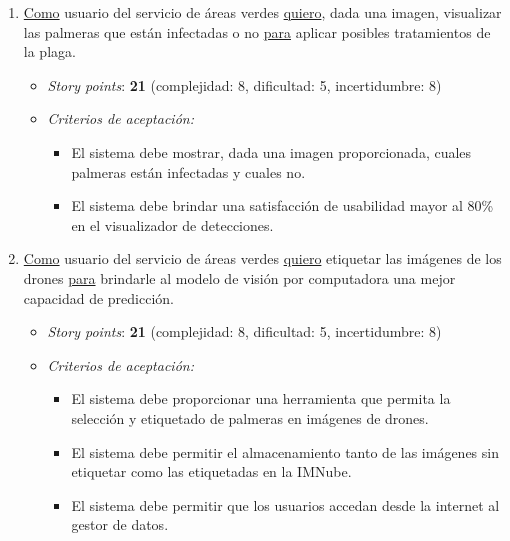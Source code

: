 \documentclass[
11pt, %
]{charter}
\begin{document}
\begin{enumerate}
  \item \underline{Como} usuario del servicio de áreas verdes \underline{quiero}, dada una imagen, visualizar las palmeras que están infectadas o no \underline{para} aplicar posibles tratamientos de la plaga.
        \begin{itemize}
          \item \textit{Story points}: \textbf{21} (complejidad: 8, dificultad: 5, incertidumbre: 8)
          \item \textit{Criterios de aceptación:}
                \begin{itemize}
                  \item El sistema debe mostrar, dada una imagen proporcionada, cuales palmeras están infectadas y cuales no.
                  \item El sistema debe brindar una satisfacción de usabilidad mayor al 80\% en el visualizador de detecciones.
                \end{itemize}
        \end{itemize}

  \item \underline{Como} usuario del servicio de áreas verdes \underline{quiero} etiquetar las imágenes de los drones \underline{para} brindarle al modelo de visión por computadora una mejor capacidad de predicción.
        \begin{itemize}
          \item \textit{Story points}: \textbf{21} (complejidad: 8, dificultad: 5, incertidumbre: 8)
          \item \textit{Criterios de aceptación:}
                \begin{itemize}
                  \item El sistema debe proporcionar una herramienta que permita la selección y etiquetado de palmeras en imágenes de drones.
                  \item El sistema debe permitir el almacenamiento tanto de las imágenes sin etiquetar como las etiquetadas en la IMNube.
                  \item El sistema debe permitir que los usuarios accedan desde la internet al gestor de datos.
                \end{itemize}
        \end{itemize}


\end{enumerate}
\end{document}
